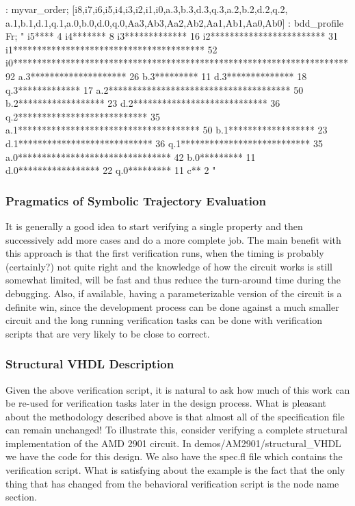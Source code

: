 \begin{hol}
: myvar\_order;
 [i8,i7,i6,i5,i4,i3,i2,i1,i0,a.3,b.3,d.3,q.3,a.2,b.2,d.2,q.2,
  a.1,b.1,d.1,q.1,a.0,b.0,d.0,q.0,Aa3,Ab3,Aa2,Ab2,Aa1,Ab1,Aa0,Ab0]
: bdd\_profile Fr;
"
 i5**** 4
 i4******* 8
 i3************* 16
 i2************************ 31
 i1**************************************** 52
 i0********************************************************************** 92
a.3******************** 26
b.3********* 11
d.3************** 18
q.3************* 17
a.2************************************** 50
b.2****************** 23
d.2**************************** 36
q.2*************************** 35
a.1************************************** 50
b.1****************** 23
d.1**************************** 36
q.1*************************** 35
a.0******************************** 42
b.0********* 11
d.0***************** 22
q.0********* 11
  c** 2
"
\end{hol}

\subsubsection{Pragmatics of Symbolic Trajectory Evaluation}

It is generally a good idea to start verifying a single property
and then successively add more cases and do a more complete job.
The main benefit with this approach is that the first verification
runs, when the timing is probably (certainly?) not quite right and the
knowledge of how the circuit works is still somewhat limited, will
be fast and thus reduce the turn-around time during the debugging.
Also, if available, having a parameterizable%
%
{} version of the circuit
is a definite win, since the development process can be done
against a much smaller circuit and the long running verification
tasks can be done with verification scripts that are very likely to be
close to correct.


\subsubsection{Structural VHDL Description}

Given the above verification script, it is natural to ask how much of this
work can be re-used%
%
{} for verification tasks later in the design process.
What is pleasant about the methodology described above is that
almost all of the specification file can remain unchanged!
To illustrate this, consider verifying a complete structural
implementation of the AMD 2901 circuit.
In demos/AM2901/structural\_VHDL we have the code for this design.
We also have the spec.fl file which contains the verification script.
What is satisfying about the example is the fact that the only
thing that has changed from the behavioral verification script is
the node name section.

